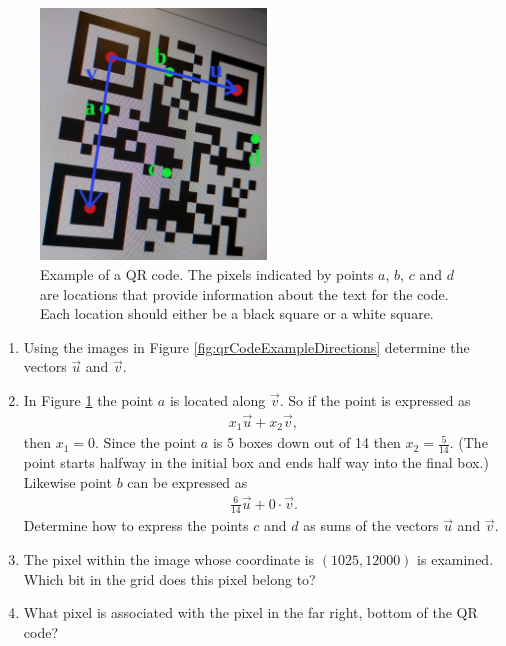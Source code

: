\begin{exercise}
  \begin{figure}[h]
    \centering
      \includegraphics[width=6cm]{img/qrCodeSnapshotUV-points.png}
    \caption{Example of a QR code. The pixels indicated by points $a$,
    $b$, $c$ and $d$ are locations that provide information about the
    text for the code. Each location should either be a black square
    or a white square.}
    \label{fig:qrCodeExampleLocations}
  \end{figure}

  \begin{enumerate}
  \item Using the images in Figure \ref{fig:qrCodeExampleDirections}
    determine the vectors $\vec{u}$ and $\vec{v}$.

    \vfill
    \clearpage

  \item In Figure \ref{fig:qrCodeExampleLocations} the point $a$ is
    located along $\vec{v}$. So if the point is expressed as
    \begin{eqnarray*}
      x_1 \vec{u} + x_2 \vec{v},
    \end{eqnarray*}
    then $x_1=0$. Since the point $a$ is 5 boxes down out of 14 then
    $x_2=\frac{5}{14}$. (The point starts halfway in the initial box
    and ends half way into the final box.) Likewise point $b$ can be
    expressed as
    \begin{eqnarray*}
      \frac{6}{14} \vec{u} + 0\cdot\vec{v}.
    \end{eqnarray*}
    Determine how to express the points $c$ and $d$ as sums of the
    vectors $\vec{u}$ and $\vec{v}$.

    \vfill


  \item The pixel within the image whose coordinate is $(1025,12000)$
    is examined. Which bit in the grid does this pixel belong to?

    \vfill

  \item What pixel is associated with the pixel in the far right,
    bottom of the QR code?

    \vfill

  \end{enumerate}

\end{exercise}


